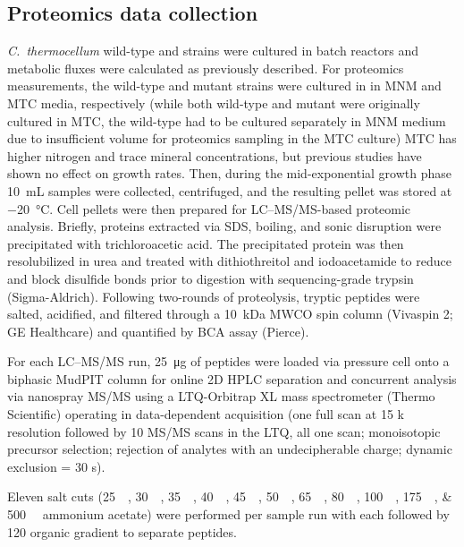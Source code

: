 \subsection{Proteomics data collection}
\textit{C.~thermocellum} wild-type and  strains were cultured in batch reactors and metabolic fluxes were calculated as previously described. \citep{thompson2015}
For proteomics measurements, the wild-type and mutant strains were cultured in in MNM and MTC media,\citep{kridelbaugh2013} respectively (while both wild-type and mutant were originally cultured in MTC,\citep{thompson2015} the wild-type had to be cultured separately in MNM medium due to insufficient volume for proteomics sampling in the MTC culture)
MTC has higher nitrogen and trace mineral concentrations, but previous studies have shown no effect on growth rates. \citep{kridelbaugh2013}
Then, during the mid-exponential growth phase \SI{10}{\milli\liter} samples were collected, centrifuged, and the resulting pellet was stored at \SI{-20}{\celsius}. Cell pellets were then prepared for LC–MS/MS-based proteomic analysis.
Briefly, proteins extracted via SDS, boiling, and sonic disruption were precipitated with trichloroacetic acid. \citep{giannone2015}
The precipitated protein was then resolubilized in urea and treated with dithiothreitol and iodoacetamide to reduce and block disulfide bonds prior to digestion with sequencing-grade trypsin (Sigma-Aldrich).
Following two-rounds of proteolysis, tryptic peptides were salted, acidified, and filtered through a \SI{10}{\kilo\dalton} MWCO spin column (Vivaspin 2; GE Healthcare) and quantified by BCA assay (Pierce).

For each LC–MS/MS run, \SI{25}{\micro\gram} of peptides were loaded via pressure cell onto a biphasic MudPIT column for online 2D HPLC separation and concurrent analysis via nanospray MS/MS using a LTQ-Orbitrap XL mass spectrometer (Thermo Scientific) operating in data-dependent acquisition (one full scan at 15 k resolution followed by 10 MS/MS scans in the LTQ, all one \si{\micro}scan; monoisotopic precursor selection; rejection of analytes with an undecipherable charge; dynamic exclusion = 30 s).\citep{giannone2015a}

Eleven salt cuts (\SIlist{25;30;35;40;45;50;65;80;100;175;500}{\milli\molar} ammonium acetate) were performed per sample run with each followed by \SI{120}{\min} organic gradient to separate peptides.

